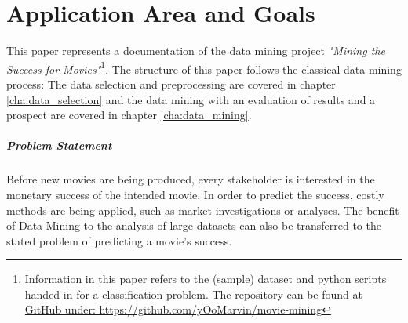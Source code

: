 \begingroup
\renewcommand{\cleardoublepage}{}
\renewcommand{\clearpage}{}
\chapter{Application Area and Goals}\label{chap:area_goals}
\endgroup


This paper represents a documentation of the data mining project \textit{"Mining the Success for Movies"}\footnote{Information in this paper refers to the (sample) dataset and python scripts handed in for a classification problem. The repository can be found at \hyperref{https://github.com/yOoMarvin/movie-mining}{external}{github}{GitHub under: https://github.com/yOoMarvin/movie-mining}}. The structure of this paper follows the classical data mining process: The data selection and preprocessing are covered in chapter \ref{cha:data_selection} and the data mining with an evaluation of results and a prospect are covered in chapter \ref{cha:data_mining}.


\paragraph{Problem Statement}
Before new movies are being produced, every stakeholder is interested in the monetary success of the intended movie. In order to predict the success, costly methods are being applied, such as market investigations or analyses. The benefit of Data Mining to the analysis of large datasets can also be transferred to the stated problem of predicting a movie's success. %

